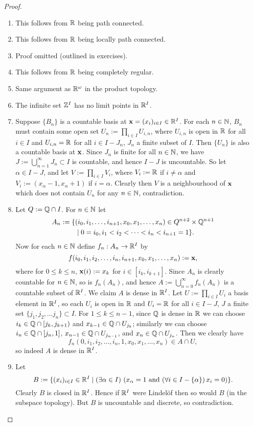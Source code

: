 \begin{proof}
  \begin{enumerate}[leftmargin=*]
  \item This follows from $\mathbb{R}$ being path connected.
  \item This follows from $\mathbb{R}$ being locally path connected.
  \item Proof omitted (outlined in exercises).
  \item This follows from $\mathbb{R}$ being completely regular.
  \item Same argument as $\mathbb{R}^\omega$ in the product topology.
  \item The infinite set $\mathbb{Z}^I$ has no limit points in $\mathbb{R}^I$.
  \item Suppose $\{B_n\}$ is a countable basis at $\boldsymbol{\mathbf{x}} = (x_i)_{i \in I} \in \mathbb{R}^I$. For each $n \in \mathbb{N}$, $B_n$ must contain some open set $U_n := \prod_{i \in I} U_{i,n}$, where $U_{i,n}$ is open in $\mathbb{R}$ for all $i \in I$ and $U_{i,n} = \mathbb{R}$ for all $i \in I - J_n$, $J_n$ a finite subset of $I$. Then $\{U_n\}$ is also a countable basis at $\boldsymbol{\mathbf{x}}$. Since $J_n$ is finite for all $n \in \mathbb{N}$, we have $J := \bigcup_{n=1}^\infty J_n \subset I$ is countable, and hence $I -  J$ is uncountable. So let $\alpha \in I -  J$, and let $V := \prod_{i \in I} V_i$, where $V_i := \mathbb{R}$ if $i \ne \alpha$ and $V_i := (x_\alpha - 1,x _\alpha + 1)$ if $i = \alpha$. Clearly then $V$ is a neighbourhood of $\boldsymbol{\mathbf{x}}$ which does not contain $U_n$ for any $n \in \mathbb{N}$, contradiction.
  \item Let $Q := \mathbb{Q} \cap I$. For $n \in \mathbb{N}$ let 
    \begin{align*}
      A_n := \{&(i_0, i_1,\ldots,i_{n+1},x_0,x_1,\ldots,x_n) \in Q^{n+2} \times \mathbb{Q}^{n+1} \\ &\mid 0 = i_0, i_1 < i_2 < \cdots < i_n < i_{n+1} = 1\}. \end{align*}
Now for each $n \in \mathbb{N}$ define $f_n : A_n \to \mathbb{R}^I$ by 
\[ f (i_0, i_1,i_2,\ldots,i_n,i_{n+1},x_0,x_1,\ldots,x_n) := \boldsymbol{\mathbf{x}}, \]
where for $0 \le k \le n$, $\boldsymbol{\mathbf{x}}(i) := x_k$ for $i \in [i_k,i_{k+1}]$. Since $A_n$ is clearly countable for $n \in \mathbb{N}$, so is $f_n(A_n)$, and hence $A := \bigcup_{n=0}^\infty f_n(A_n)$ is a countable subset of $\mathbb{R}^I$. We claim $A$ is dense in $\mathbb{R}^I$. Let $U := \prod_{i \in I} U_i$ a basis element in $\mathbb{R}^I$, so each $U_i$ is open in $\mathbb{R}$ and $U_i = \mathbb{R}$ for all $i \in I - J$, $J$ a finite set $\{j_1,j_2,\ldots j_n\} \subset I$. For $1 \le k \le n - 1$, since $\mathbb{Q}$ is dense in $\mathbb{R}$ we can choose $i_k \in \mathbb{Q} \cap [j_k, j_{k+1})$ and $x_{k-1} \in \mathbb{Q} \cap U_{j_k}$; similarly we can choose $i_n \in \mathbb{Q} \cap [j_n, 1]$, $x_{n-1} \in \mathbb{Q} \cap U_{j_{n-1}}$, and $x_n \in \mathbb{Q} \cap U_{j_n}$. Then we clearly have
\[ f_n(0, i_1,i_2,\ldots,i_n,1,x_0,x_1,\ldots,x_n) \in A \cap U, \]
so indeed $A$ is dense in $\mathbb{R}^I$.
  \item Let 
\[ B := \{(x_i)_{i \in I} \in \mathbb{R}^I \mid (\exists \alpha \in I)\ (x_\alpha = 1\ \text{and}\ (\forall i \in I - \{\alpha\})\,x_i = 0)\}. \]
Clearly $B$ is closed in $\mathbb{R}^I$. Hence if $\mathbb{R}^I$ were Lindel\"of then so would $B$ (in the subspace topology). But $B$ is uncountable and discrete, so contradiction.  
\qedhere
  \end{enumerate}
\end{proof}

